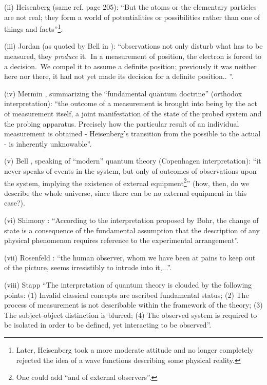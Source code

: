 \documentclass[12pt,onecolumn]{article}%
\begin{document}
(ii) Heisenberg (same ref. page 205): ``But the atoms or the elementary
particles are not real; they form a world of potentialities or possibilities
rather than one of things and facts''\footnote{Later, Heisenberg took a more
moderate attitude and no longer completely rejected the idea of a wave
functions describing some physical reality.}.

(iii) Jordan (as quoted by Bell in \cite{Bertlmann}): ``observations not only
disturb what has to be measured, they \textit{produce} it.\ In a measurement
of position, the electron is forced to a decision.\ We compel it to assume a
definite position; previously it was neither here nor there, it had not yet
made its decision for a definite position.. ''.

(iv) Mermin \cite{Mermin}, summarizing the ``fundamental quantum doctrine''
(orthodox interpretation): ``the outcome of a measurement is brought into
being by the act of measurement itself, a joint manifestation of the state of
the probed system and the probing apparatus. Precisely how the particular
result of an individual measurement is obtained - Heisenberg's transition from
the possible to the actual - is inherently unknowable''.

(v) Bell \cite{Bell-speakable}, speaking of ``modern'' quantum theory
(Copenhagen interpretation): ``it never speaks of events in the system, but
only of outcomes of observations upon the system, implying the existence of
external equipment\footnote{One could add ``and of external observers''.}''
(how, then, do we describe the whole universe, since there can be no external
equipment in this case?).

(vi) Shimony \cite{Shimony}: ``According to the interpretation proposed by
Bohr, the change of state is a consequence of the fundamental assumption that
the description of any physical phenomenon requires reference to the
experimental arrangement''.

(vii) Rosenfeld \cite{Rosenfeld}: ``the human observer, whom we have been at
pains to keep out of the picture, seems irresistibly to intrude into it,...''.

(viii) Stapp \cite{Stapp-2} ``The interpretation of quantum theory is clouded
by the following points: (1) Invalid classical concepts are ascribed
fundamental status; (2) The process of measurement is not describable within
the framework of the theory; (3) The subject-object distinction is blurred;
(4) The observed system is required to be isolated in order to be defined, yet
interacting to be observed''.
\end{document}
